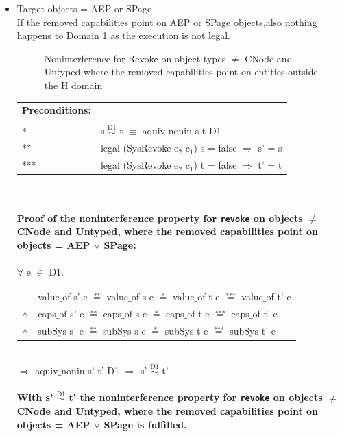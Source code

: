 \documentclass[11pt,a4paper,twoside]{article}
\begin{document}
{\begin{itemize}
\begin{tabular}{ll}
\end{tabular} \\
$\Rightarrow$ aquiv$\_$nonin s' t' D1 $\Rightarrow$ s' $\overset{\text{D1}}{\sim}$ t' \\ \\
\textbf{With s' $\overset{\text{D1}}{\sim}$ t' the noninterference property for \texttt{revoke} on objects $\neq$ CNode and Untyped, where the removed capabilities point on entities in the same domain, is fulfilled.}  
\clearpage
\item Target objects = AEP or SPage \\
If the removed capabilities point on AEP or SPage objects,also nothing happens to Domain 1 as the execution is not legal. 
\begin{flushleft}
\begin{figure}[H]
\caption{Noninterference for Revoke on object types $\neq$ CNode and Untyped where the removed capabilities point on entities outside the H domain}
\label{fig:RevokeOutside2}
\end{figure}
\end{flushleft}
\begin{tabular}{ll}
\textbf{Preconditions:} \\ \\
* & s $\overset{\text{D1}}{\sim}$ t $\equiv$ aquiv$\_$nonin s t D1	\\ 
** & legal (SysRevoke e$_2$ c$_1$) s = false $\Rightarrow$ s' = s \\ 
*** & legal (SysRevoke e$_2$ c$_1$) t = false $\Rightarrow$ t' = t
\end{tabular} \\ \\ 
\textbf{Proof of the noninterference property for \texttt{revoke} on objects $\neq$ CNode and Untyped, where the removed capabilities point on objects = AEP $\vee$ SPage:}\\ \\
$\forall$ e $\in$ D1. \\
\begin{tabular}{ll}
& value$\_$of s' e $\overset{\text{**}}{=}$ value$\_$of s e $\overset{\text{*}}{=}$ value$\_$of t e $\overset{\text{***}}{=}$ value$\_$of t' e \\
$\wedge$ & caps$\_$of s' e $\overset{\text{**}}{=}$ caps$\_$of s e $\overset{\text{*}}{=}$ caps$\_$of t e $\overset{\text{***}}{=}$ caps$\_$of t' e \\
$\wedge$ & subSys s' e $\overset{\text{**}}{=}$ subSys s e $\overset{\text{*}}{=}$ subSys t e $\overset{\text{***}}{=}$ subSys t' e
\end{tabular} \\
$\Rightarrow$ aquiv$\_$nonin s' t' D1 $\Rightarrow$ s' $\overset{\text{D1}}{\sim}$ t' \\ \\
\textbf{With s' $\overset{\text{D1}}{\sim}$ t' the noninterference property for \texttt{revoke} on objects $\neq$ CNode and Untyped, where the removed capabilities point on objects = AEP $\vee$ SPage is fulfilled.}  
\clearpage
\end{itemize}
}
\end{document}
